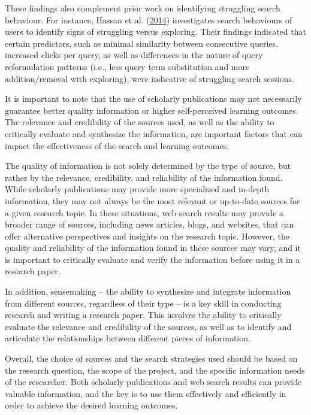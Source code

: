 \documentclass[letterpaper, nobind]{templates/ociamthesis}
\begin{document}
These findings also complement prior work on identifying struggling search behaviour.
For instance, Hassan et al. (\protect\hyperlink{ref-hassan2014struggling}{2014}) investigates search behaviours of users to identify signs of struggling versus exploring.
Their findings indicated that certain predictors, such as minimal similarity between consecutive queries, increased clicks per query, as well as differences in the nature of query reformulation patterns (i.e., less query term substitution and more addition/removal with exploring), were indicative of struggling search sessions.

It is important to note that the use of scholarly publications may not necessarily guarantee better quality information or higher self-perceived learning outcomes.
The relevance and credibility of the sources used, as well as the ability to critically evaluate and synthesize the information, are important factors that can impact the effectiveness of the search and learning outcomes.

The quality of information is not solely determined by the type of source, but rather by the relevance, credibility, and reliability of the information found.
While scholarly publications may provide more specialized and in-depth information, they may not always be the most relevant or up-to-date sources for a given research topic.
In these situations, web search results may provide a broader range of sources, including news articles, blogs, and websites, that can offer alternative perspectives and insights on the research topic.
However, the quality and reliability of the information found in these sources may vary, and it is important to critically evaluate and verify the information before using it in a research paper.

In addition, sensemaking -- the ability to synthesize and integrate information from different sources, regardless of their type -- is a key skill in conducting research and writing a research paper.
This involves the ability to critically evaluate the relevance and credibility of the sources, as well as to identify and articulate the relationships between different pieces of information.

Overall, the choice of sources and the search strategies used should be based on the research question, the scope of the project, and the specific information needs of the researcher. Both scholarly publications and web search results can provide valuable information, and the key is to use them effectively and efficiently in order to achieve the desired learning outcomes.
\end{document}
